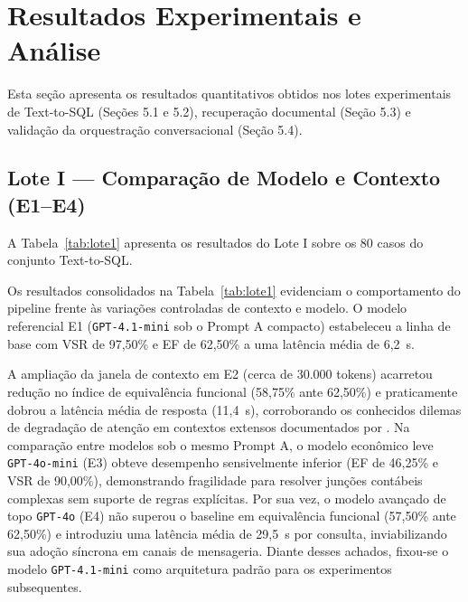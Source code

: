 \documentclass[12pt]{article}
\begin{document}
\section{Resultados Experimentais e Análise}

Esta seção apresenta os resultados quantitativos obtidos nos lotes experimentais de Text-to-SQL (Seções 5.1 e 5.2), recuperação documental (Seção 5.3) e validação da orquestração conversacional (Seção 5.4).

\subsection{Lote I --- Comparação de Modelo e Contexto (E1--E4)}

A Tabela~\ref{tab:lote1} apresenta os resultados do Lote I sobre os 80 casos do conjunto Text-to-SQL.

\begin{table}[htbp]
\centering
\caption{Lote I --- Comparativo de modelos e contextos ($N_{\text{SQL}} = 80$)}
\label{tab:lote1}
\end{table}

Os resultados consolidados na Tabela~\ref{tab:lote1} evidenciam o comportamento do pipeline frente às variações controladas de contexto e modelo. O modelo referencial E1 (\texttt{GPT-4.1-mini} sob o Prompt A compacto) estabeleceu a linha de base com VSR de 97,50\% e EF de 62,50\% a uma latência média de 6,2~s.

A ampliação da janela de contexto em E2 (cerca de 30.000 tokens) acarretou redução no índice de equivalência funcional (58,75\% ante 62,50\%) e praticamente dobrou a latência média de resposta (11,4~s), corroborando os conhecidos dilemas de degradação de atenção em contextos extensos documentados por . Na comparação entre modelos sob o mesmo Prompt A, o modelo econômico leve \texttt{GPT-4o-mini} (E3) obteve desempenho sensivelmente inferior (EF de 46,25\% e VSR de 90,00\%), demonstrando fragilidade para resolver junções contábeis complexas sem suporte de regras explícitas. Por sua vez, o modelo avançado de topo \texttt{GPT-4o} (E4) não superou o baseline em equivalência funcional (57,50\% ante 62,50\%) e introduziu uma latência média de 29,5~s por consulta, inviabilizando sua adoção síncrona em canais de mensageria. Diante desses achados, fixou-se o modelo \texttt{GPT-4.1-mini} como arquitetura padrão para os experimentos subsequentes.
\end{document}
